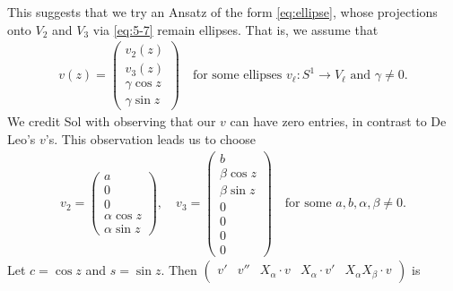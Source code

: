 \documentclass[a4paper,10pt,leqno]{article}
\numberwithin{equation}{section}
\theoremstyle{plain}
\theoremstyle{definition}
\theoremstyle{remark}
\newcommand{\mat}[1]{\begin{matrix}#1\end{matrix}}
\newcommand{\pmat}[1]{\left(\mat{#1}\right)}
\begin{document}
This suggests that we try an Ansatz of the form \eqref{eq:ellipse}, whose projections onto $V_2$ and $V_3$ via \eqref{eq:5-7} remain ellipses.
That is, we assume that
\begin{align}
v(z) = \pmat{v_2(z) \\ v_3(z) \\ \gamma \cos z \\ \gamma \sin z}
\quad\text{for some ellipses $v_\ell \colon S^1 \to V_\ell$ and $\gamma \neq 0$}.
\end{align}
We credit Sol with observing that our $v$ can have zero entries, in contrast to De Leo's $v$'s.
This observation leads us to choose
\begin{align}
v_2 = \pmat{a\\ 0\\ 0\\ \alpha \cos z\\ \alpha \sin z},\quad 
v_3 = \pmat{b\\ \beta \cos z\\ \beta \sin z\\ 0\\ 0\\ 0\\ 0}
\quad\text{for some $a, b, \alpha, \beta \neq 0$}.
\end{align}
Let $c = \cos z$ and $s = \sin z$.
Then $\pmat{v' &v'' &X_\alpha \cdot v &X_\alpha \cdot v' &X_\alpha X_\beta \cdot v}$ is
\end{document}
